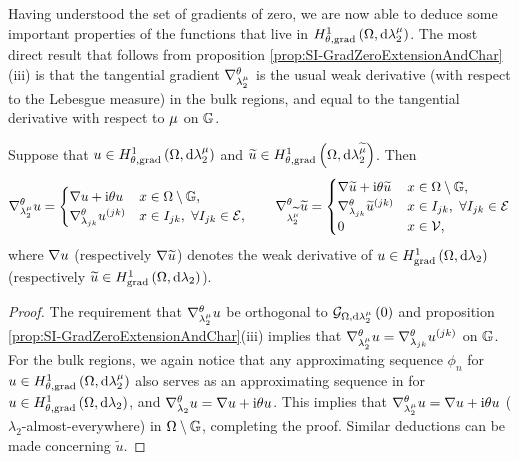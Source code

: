 Having understood the set of gradients of zero, we are now able to deduce some important properties of the functions that live in $H^1_{\theta, \mathrm{grad}}\left( \Omega, \mathrm{d}\lambda_2^{\mu} \right)$.
The most direct result that follows from proposition \ref{prop:SI-GradZeroExtensionAndChar}(iii) is that the tangential gradient $\nabla^{\theta}_{\lambda_2^{\mu}}$ is the usual weak derivative (with respect to the Lebesgue measure) in the bulk regions, and equal to the tangential derivative with respect to $\mu$ on $\mathbb{G}$.
\begin{cory}
	Suppose that $u\in H^1_{\theta, \mathrm{grad}}\left( \Omega, \mathrm{d}\lambda_2^{\mu} \right)$ and $\widetilde{u}\in H^1_{\theta, \mathrm{grad}}\left( \Omega, \mathrm{d}\lambda_2^{\widetilde{\mu}} \right)$.
	Then 
	\begin{align*}
		\nabla^{\theta}_{\lambda_2^{\mu}}u = \begin{cases} \nabla u + \mathrm{i}\theta u & x\in\Omega\setminus\mathbb{G}, \\ \nabla^{\theta}_{\lambda_{jk}}u^{(jk)} & x\in I_{jk}, \ \forall I_{jk}\in\mathcal{E}, \end{cases}
		\qquad
		\nabla^{\theta}_{\lambda_2^{\widetilde{\mu}}}\widetilde{u} = \begin{cases} \nabla\widetilde{u} + \mathrm{i}\theta\widetilde{u} & x\in\Omega\setminus\mathbb{G}, \\ \nabla^{\theta}_{\lambda_{jk}}\widetilde{u} ^{(jk)} & x\in I_{jk}, \ \forall I_{jk}\in\mathcal{E} \\ 0 & x\in\mathcal{V}, \end{cases}
	\end{align*}
	where $\nabla u$ (respectively $\nabla\widetilde{u}$) denotes the weak derivative of $u\in H^1_\mathrm{grad}\left( \Omega, \mathrm{d}\lambda_2 \right)$ (respectively $\widetilde{u}\in H^1_\mathrm{grad}\left( \Omega, \mathrm{d}\lambda_2 \right)$).
\end{cory}
\begin{proof}
	The requirement that $\nabla^{\theta}_{\lambda_2^{\mu}}u$ be orthogonal to $\mathcal{G}_{ \Omega, \mathrm{d}\lambda_2^{\mu}}\left( 0 \right)$ and proposition \ref{prop:SI-GradZeroExtensionAndChar}(iii) implies that $\nabla^{\theta}_{\lambda_2^{\mu}}u = \nabla^{\theta}_{\lambda_{jk}}u^{(jk)}$ on $\mathbb{G}$.
	For the bulk regions, we again notice that any approximating sequence $\phi_n$ for $u\in H^1_{\theta, \mathrm{grad}}\left( \Omega, \mathrm{d}\lambda_2^{\mu} \right)$ also serves as an approximating sequence in for $u\in H^1_{\theta, \mathrm{grad}}\left( \Omega, \mathrm{d}\lambda_2 \right)$, and $\nabla^{\theta}_{\lambda_2}u = \nabla u + \mathrm{i}\theta u$.
	This implies that $\nabla^{\theta}_{\lambda_2^{\mu}}u = \nabla u + \mathrm{i}\theta u$ ($\lambda_2$-almost-everywhere) in $\Omega\setminus\mathbb{G}$, completing the proof.
	Similar deductions can be made concerning $\widetilde{u}$.
\end{proof}

